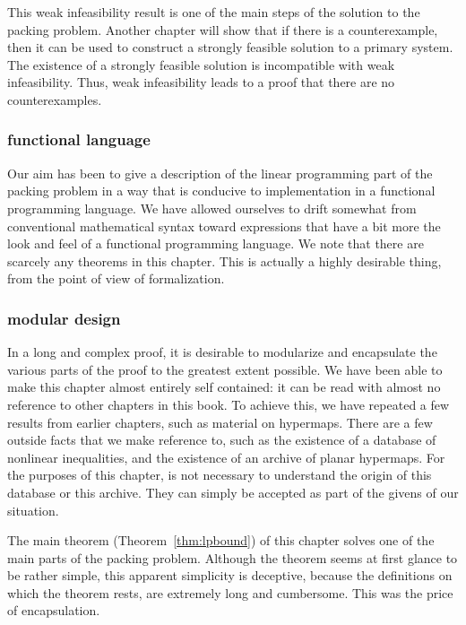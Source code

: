 This weak infeasibility result is one of the main steps of the
solution to the packing problem.  Another chapter will show that
if there is a counterexample, then it can
be used to construct a strongly feasible solution to a primary
system.  The existence of a strongly feasible solution is
incompatible with weak infeasibility.  Thus, weak infeasibility
leads to a proof that there are no counterexamples.


\subsubsection{functional language}

Our aim has been to give a description of the linear programming
part of the packing problem in a way that is conducive to
implementation in a functional programming language.  We have
allowed ourselves to drift somewhat from conventional mathematical
syntax toward expressions that have a bit more the look and feel
of a functional programming language.  We note that there are
scarcely any theorems in this chapter.  This is actually a highly
desirable thing, from the point of view of formalization.

\subsubsection{modular design}

In a long and complex proof, it is desirable to modularize and
encapsulate the various parts of the proof to the greatest extent
possible.  We have been able to make this chapter almost entirely
self contained: it can be read with almost no reference to other
chapters in this book.  To achieve this, we have repeated a few
results from earlier chapters, such as material on hypermaps.
There are a few outside facts that we make reference to, such as
the existence of a database of nonlinear inequalities, and the
existence of an archive of planar hypermaps.  For the purposes of
this chapter, is not necessary to understand the origin of this
database or this archive. They can simply be accepted as part of
the givens of our situation.

The main theorem (Theorem~\ref{thm:lpbound}) of this chapter solves
one of the main parts of the packing problem.
Although the theorem seems at first glance to be rather simple,
this apparent simplicity is deceptive, because the definitions on
which the theorem rests, are extremely long and cumbersome.  This
was the price of encapsulation.

